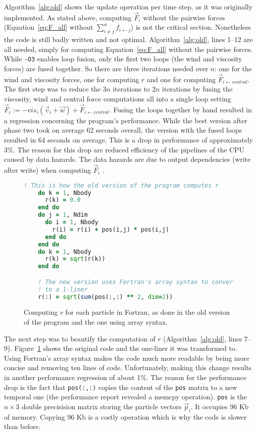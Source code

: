 \documentclass[twoside,11pt]{article}
\begin{document}
Algorithm~\ref{alg:old} shows the update operation per time step,
as it was originally implemented.
As stated above, computing $\vec{F}_i$ without the pairwise
forces (Equation~\ref{eq:F_all} without
$\sum_{i \neq j}^n f_{i \leftarrow j}$) is not the critical section.
Nonetheless the code is still badly written and not optimal.
Algorithm~\ref{alg:old}, lines 1--12 are all needed, simply for
computing Equation~\ref{eq:F_all} without the pairwise forces.
While \texttt{-O3} enables loop fusion, only the first two loops
(the wind and viscosity forces) are fused together.
So there are three iterations needed over $n$: one for the wind and
viscosity forces, one for computing $r$ and one for computing
$\vec{F}_{i \leftarrow central}$.
The first step was to reduce the $3n$ iterations to $2n$ iterations by
fusing the viscosity, wind and central force computations all into
a single loop setting $\vec{F}_i := -vis_i(\vec{v}_i + \vec{w}) +
  \vec{F}_{i \leftarrow central}$.
Fusing the loops together by hand resulted in a regression concerning
the program's performance.
While the best version after phase two took on average 62 seconds
overall, the version with the fused loops resulted in 64 seconds
on average.
This is a drop in performance of approximately 3\%.
The reason for this drop are reduced efficiency of the pipelines of
the CPU caused by data hazards.
The data hazards are due to output dependencies (write after write)
when computing $\vec{F}_i$ \citep[see e.g.][]{patterson_2014}.

\begin{figure} %
  \begin{lstlisting}[language=Fortran]
    ! This is how the old version of the program computes r
    do k = 1, Nbody
      r(k) = 0.0
    end do
    do j = 1, Ndim
      do i = 1, Nbody
        r(i) = r(i) + pos(i,j) * pos(i,j)
      end do
    end do
    do k = 1, Nbody
      r(k) = sqrt(r(k))
    end do

    ! The new version uses Fortran's array syntax to convert this
    ! to a 1-liner
    r(:) = sqrt(sum(pos(:,:) ** 2, dim=2))

  \end{lstlisting}
  \caption{Computing $r$ for each particle in Fortran, as done in the
    old version of the program and the one using array syntax.}
  \label{fig:r}
\end{figure} %

The next step was to beautify the computation of $r$
(Algorithm~\ref{alg:old}, lines 7--9).
Figure~\ref{fig:r} shows the original code and the one-liner it
was transformed to.
Using Fortran's array syntax makes the code much more readable by
being more concise and removing ten lines of code.
Unfortunately, making this change results in another performance
regression of about 1\%.
The reason for the performance drop is the fact that \texttt{pos(:,:)}
copies the content of the \texttt{pos} matrix to a new temporal one
(the performance report revealed a memcpy operation).
\texttt{pos} is the $n \times 3$ double precisision matrix storing the
particle vectors $\vec{p}_i$.
It occupies 96 Kb of memory.
Copying 96 Kb is a costly operation which is why the code is slower
than before.
\end{document}
